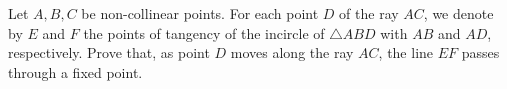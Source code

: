 Let $A,B,C$ be non-collinear points. For each point $D$ of the ray $AC$, we denote by $E$ and $F$ the points of tangency of the incircle of $\triangle ABD$ with $AB$ and $AD$, respectively. Prove that, as point $D$ moves along the ray $AC$, the line $EF$ passes through a fixed point.